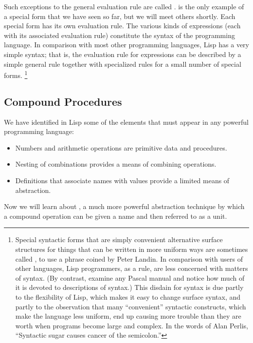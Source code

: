 Such exceptions to the general evaluation rule are called .
 is the only example of a special form that we have seen so far, but we will meet others shortly.
Each special form has its own evaluation rule.
The various kinds of expressions (each with its associated evaluation rule) constitute the syntax of the programming language.
In comparison with most other programming languages, Lisp has a very simple syntax;
that is, the evaluation rule for expressions can be described by a simple general rule together with specialized rules for a small number of special forms.%
\footnote{
	Special syntactic forms that are simply convenient alternative surface structures for things that can be written in more uniform ways are sometimes called , to use a phrase coined by Peter Landin.
	In comparison with users of other languages, Lisp programmers, as a rule, are less concerned with matters of syntax.
	(By contrast, examine any Pascal manual and notice how much of it is devoted to descriptions of syntax.)
	This disdain for syntax is due partly to the flexibility of Lisp, which makes it easy to change surface syntax, and partly to the observation that many “convenient” syntactic constructs, which make the language less uniform, end up causing more trouble than they are worth when programs become large and complex.
	In the words of Alan Perlis,
	“Syntactic sugar causes cancer of the semicolon.”
}



\subsection{Compound Procedures}
\label{Section 1.1.4}

We have identified in Lisp some of the elements that must appear in any powerful programming language:
\begin{itemize}

	\item
	Numbers and arithmetic operations are primitive data and procedures.

	\item
	Nesting of combinations provides a means of combining operations.

	\item
	Definitions that associate names with values provide a limited means of
	abstraction.

\end{itemize}
Now we will learn about , a much more powerful abstraction technique by which a compound operation can be given a name and then referred to as a unit.

